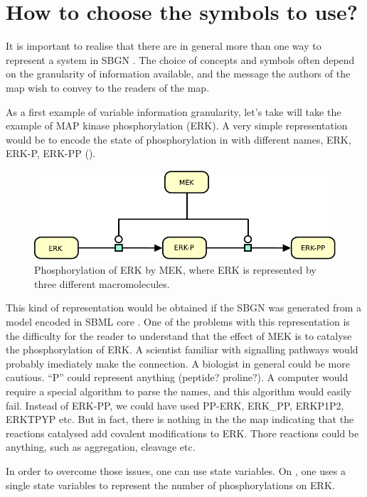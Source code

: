\section{How to choose the symbols to use?}
\label{sec:choose}

It is important to realise that there are in general more than one way to represent a system in SBGN \PD. The choice of concepts and symbols often depend on the granularity of information available, and the message the authors of the map wish to convey to the readers of the map. 

As a first example of variable information granularity, let's take will take the example of MAP kinase phosphorylation (ERK). A very simple representation would be to encode the state of phosphorylation in  with different names, ERK, ERK-P, ERK-PP ().
 
\begin{figure}[H]
  \centering
  \includegraphics[scale = 1]{images/MAPK-NoVar}
  \caption{Phosphorylation of ERK by MEK, where ERK is represented by three different macromolecules.}
  \label{fig:MAPK-NoVar}
\end{figure}

This kind of representation would be obtained if the SBGN \PDm was generated from a model encoded in SBML core \cite{Hucka:2003}. One of the problems with this representation is the difficulty for the reader to understand that the effect of MEK is to catalyse the phosphorylation of ERK. A scientist familiar with signalling pathways would probably imediately make the connection. A biologist in general could be more cautious. ``P'' could represent anything (peptide? proline?). A computer would require a special algorithm to parse the names, and this algorithm would easily fail. Instead of ERK-PP, we could have used PP-ERK, ERK\_PP, ERKP1P2, ERKTPYP etc. But in fact, there is nothing in the the map  indicating that the reactions catalysed add covalent modifications to ERK. Thore reactions could be anything, such as aggregation, cleavage etc.

In order to overcome those issues, one can use state variables. On , one uses a single state variables to represent the number of phosphorylations on ERK. 

